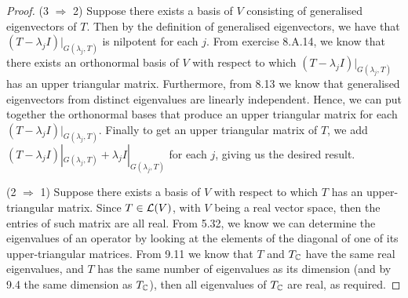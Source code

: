 \begin{proof}
    (3 $\Rightarrow$ 2) Suppose there exists a basis of $V$ consisting of generalised eigenvectors of $T$. Then by the definition of generalised eigenvectors, we have that $(T-\lambda_j I)|_{G(\lambda_j, T)}$ is nilpotent for each $j$. From exercise 8.A.14, we know that there exists an orthonormal basis of $V$ with respect to which $(T-\lambda_j I)|_{G(\lambda_j, T)}$ has an upper triangular matrix. Furthermore, from 8.13 we know that generalised eigenvectors from distinct eigenvalues are linearly independent. Hence, we can put together the orthonormal bases that produce an upper triangular matrix for each $(T-\lambda_j I)|_{G(\lambda_j, T)}$. Finally to get an upper triangular matrix of $T$, we add $(T-\lambda_j I)|_{G(\lambda_j, T)} + \lambda_j I|_{G(\lambda_j, T)}$ for each $j$, giving us the desired result.
    
    (2 $\Rightarrow$ 1) Suppose there exists a basis of $V$ with respect to which $T$ has an upper-triangular matrix. Since $T\in\mathcal{L}(V)$, with $V$ being a real vector space, then the entries of such matrix are all real. From 5.32, we know we can determine the eigenvalues of an operator by looking at the elements of the diagonal of one of its upper-triangular matrices. From 9.11 we know that $T$ and $T_{\mathbb{C}}$ have the same real eigenvalues, and $T$ has the same number of eigenvalues as its dimension (and by 9.4 the same dimension as $T_{\mathbb{C}}$), then all eigenvalues of $T_{\mathbb{C}}$ are real, as required.
\end{proof}